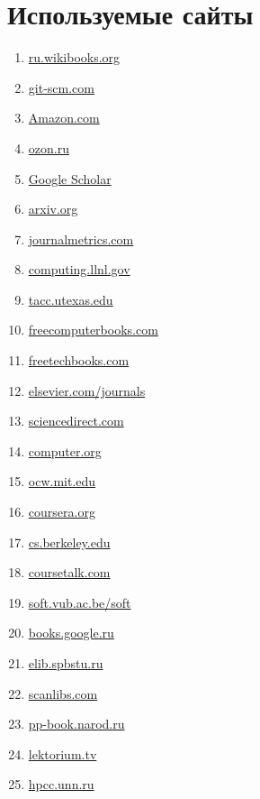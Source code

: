 \documentclass{article}
\begin{document}
\section{Используемые сайты}
	\begin{enumerate}
		\item \href{https://ru.wikibooks.org}{ru.wikibooks.org}
		\item \href{https://git-scm.com}{git-scm.com}
		\item \href{https://www.amazon.com}{Amazon.com}
		\item \href{https://www.ozon.ru}{ozon.ru}
		\item \href{https://scholar.google.ru/schhp?hl=ru&as_sdt=0,5}{Google Scholar}
		\item \href{http://arxiv.org}{arxiv.org}
		\item \href{http://www.journalmetrics.com}{journalmetrics.com}
		\item \href{https://computing.llnl.gov}{computing.llnl.gov}
		\item \href{https://www.tacc.utexas.edu}{tacc.utexas.edu}
		\item \href{http://freecomputerbooks.com}{freecomputerbooks.com}
		\item \href{http://www.freetechbooks.com}{freetechbooks.com}
		\item \href{https://www.elsevier.com/journals/title/all}{elsevier.com/journals}
		\item \href{http://www.sciencedirect.com}{sciencedirect.com}
		\item \href{https://www.computer.org}{computer.org}
		\item \href{http://ocw.mit.edu/index.htm}{ocw.mit.edu}
		\item \href{https://www.coursera.org}{coursera.org}
		\item \href{https://www.cs.berkeley.edu/}{cs.berkeley.edu}
		\item \href{https://www.coursetalk.com}{coursetalk.com}
		\item \href{http://soft.vub.ac.be/soft}{soft.vub.ac.be/soft}
		\item \href{https://books.google.ru}{books.google.ru}
		\item \href{http://elib.spbstu.ru}{elib.spbstu.ru}
		\item \href{http://scanlibs.com}{scanlibs.com}
		\item \href{http://pp-book.narod.ru}{pp-book.narod.ru}
		\item \href{https://www.lektorium.tv}{lektorium.tv}
		\item \href{http://www.hpcc.unn.ru}{hpcc.unn.ru}
		
	\end{enumerate}
\end{document}
